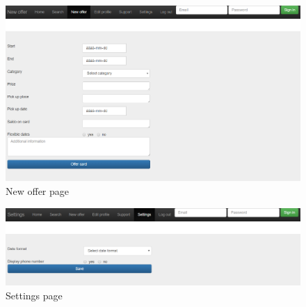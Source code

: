 \documentclass[11pt,twoside,a4paper]{report}
\begin{document}
\begin{appendices}
\begin{figure}
	\centering
	\includegraphics[width=\textwidth]{webapp-newoffer.png}
	\caption{New offer page}
	\label{figure:new-offer-page}
\end{figure}

\begin{figure}
	\centering
	\includegraphics[width=\textwidth]{webapp-settings.png}
	\caption{Settings page}
	\label{figure:settings-page}
\end{figure}

\end{appendices}
\end{document}
